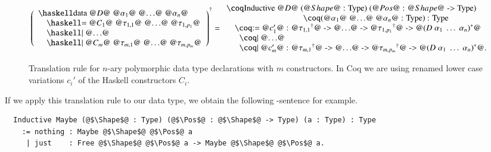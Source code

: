 \begin{figure}[H]
  \[
    \toCoq{\left(
      \begin{array}{ll}
        \haskellM{data @$D$@ @$\alpha_1$@ @$\ldots$@ @$\alpha_n$@}              \\
          \quad\haskellM{= @$C_1$@ @$\tau_{1,1}$@ @$\ldots$@  @$\tau_{1,p_1}$@} \\
          \quad\haskellM{| @$\ldots$@}                                          \\
          \quad\haskellM{| @$C_m$@ @$\tau_{m,1}$@ @$\ldots$@  @$\tau_{m,p_m}$@}
      \end{array}
    \right)}
    = \begin{array}{l}
      \coqM{Inductive @$D$@ (@$\Shape$@ : Type) (@$\Pos$@ : @$\Shape$@ -> Type)}                      \\
      \phantom{\coqM{Inductive @$D$@}}\;\;\coqM{(@$\alpha_1$@ @$\ldots$@ @$\alpha_n$@ : Type) : Type} \\
      \quad\coqM{:= @$c_1'$@ : @${\tau_{1,1}}^{\dagger}$@ -> @$\ldots$@ -> @${\tau_{1,p_1}}^{\dagger}$@ -> @${(D\;\alpha_1\;\ldots\;\alpha_n)}^{*}$@} \\
      \quad\;\;\coqM{| @$\ldots$@}                                                                                                                             \\
      \quad\;\;\coqM{| @$c_m'$@ : @${\tau_{m,1}}^{\dagger}$@ -> @$\ldots$@ -> @${\tau_{m,p_m}}^{\dagger}$@ -> @${(D\;\alpha_1\;\ldots\;\alpha_n)}^{*}$@.}
    \end{array}
  \]
  \caption{Translation rule for $n$-ary polymorphic data type declarations with $m$ constructors. In Coq we are using renamed lower case variations $c_i'$ of the Haskell constructors $C_i$.}
  \label{fig:translation:type-decl:data}
\end{figure}

If we apply this translation rule to our  data type, we obtain the following -sentence for example.
\begin{verbatim}
  Inductive Maybe (@$\Shape$@ : Type) (@$\Pos$@ : @$\Shape$@ -> Type) (a : Type) : Type
    := nothing : Maybe @$\Shape$@ @$\Pos$@ a
     | just    : Free @$\Shape$@ @$\Pos$@ a -> Maybe @$\Shape$@ @$\Pos$@ a.
\end{verbatim}

